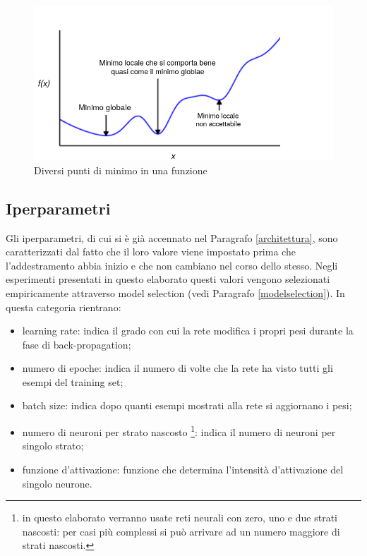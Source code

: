 \documentclass[12pt]{report}
\begin{document}
\begin{figure}[H]
\begin{center}
\includegraphics[scale=0.5]{localMinima.png}
\caption{Diversi punti di minimo in una funzione}
\label{localMinima}
\end{center}
\end{figure}

\subsection{Iperparametri}\label{iperparametri}
Gli iperparametri, di cui si è già accennato nel Paragrafo \ref{architettura}, sono caratterizzati dal fatto che il loro valore viene impostato prima che l'addestramento abbia inizio e che non cambiano nel corso dello stesso. Negli esperimenti presentati in questo elaborato questi valori vengono selezionati empiricamente attraverso model selection (vedi Paragrafo \ref{modelselection}).
In questa categoria rientrano:
\begin{itemize}
\item{learning rate}: indica il grado con cui la rete modifica i propri pesi durante la fase di back-propagation;
\item{numero di epoche}: indica il numero di volte che la rete ha visto tutti gli esempi del training set;
\item{batch size}: indica dopo quanti esempi mostrati alla rete si aggiornano i pesi;
\item{numero di neuroni per strato nascosto \footnote{in questo elaborato verranno usate reti neurali con zero, uno e due strati nascosti: per casi più complessi si può arrivare ad un numero maggiore di strati nascosti.}}: indica il numero di neuroni per singolo strato;
\item{funzione d'attivazione}: funzione che determina l'intensità d'attivazione del singolo neurone.
\end{itemize}
\end{document}
